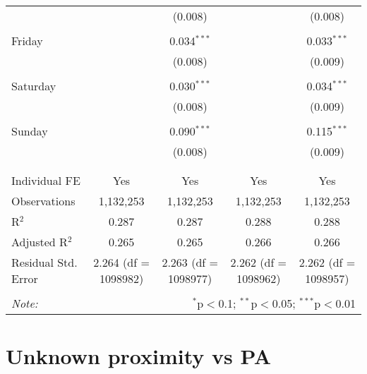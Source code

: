 \documentclass[
]{article}
\begin{document}
\begin{table}[!htbp]
{\begin{tabular}{@{\extracolsep{5pt}}lcccc}
  &  & (0.008) &  & (0.008) \\ 
  & & & & \\ 
 Friday &  & 0.034$^{***}$ &  & 0.033$^{***}$ \\ 
  &  & (0.008) &  & (0.009) \\ 
  & & & & \\ 
 Saturday &  & 0.030$^{***}$ &  & 0.034$^{***}$ \\ 
  &  & (0.008) &  & (0.009) \\ 
  & & & & \\ 
 Sunday &  & 0.090$^{***}$ &  & 0.115$^{***}$ \\ 
  &  & (0.008) &  & (0.009) \\ 
  & & & & \\ 
\hline \\[-1.8ex] 
Individual FE & Yes & Yes & Yes & Yes \\ 
Observations & 1,132,253 & 1,132,253 & 1,132,253 & 1,132,253 \\ 
R$^{2}$ & 0.287 & 0.287 & 0.288 & 0.288 \\ 
Adjusted R$^{2}$ & 0.265 & 0.265 & 0.266 & 0.266 \\ 
Residual Std. Error & 2.264 (df = 1098982) & 2.263 (df = 1098977) & 2.262 (df = 1098962) & 2.262 (df = 1098957) \\ 
\hline 
\hline \\[-1.8ex] 
\textit{Note:}  & \multicolumn{4}{r}{$^{*}$p$<$0.1; $^{**}$p$<$0.05; $^{***}$p$<$0.01} \\ 
\end{tabular}
} 
\end{table} 
\newpage
\section{Unknown proximity vs PA}
\end{document}
